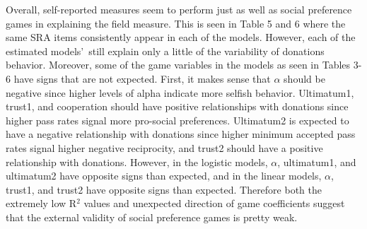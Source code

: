 \documentclass[12pt]{article}
\begin{document}

Overall, self-reported measures seem to perform just as well as social preference games in explaining the field measure. This is seen in Table 5 and 6 where the same SRA items consistently appear in each of the models. However, each of the estimated models\rq \ still explain only a little of the variability of donations behavior. Moreover, some of the game variables in the models as seen in Tables 3-6 have signs that are not expected. First, it makes sense that \(\alpha\) should be negative since higher levels of alpha indicate more selfish behavior. Ultimatum1, trust1, and cooperation should have positive relationships with donations since higher pass rates signal more pro-social preferences. Ultimatum2 is expected to have a negative relationship with donations since higher minimum accepted pass rates signal higher negative reciprocity, and trust2 should have a positive relationship with donations. However, in the logistic models, \(\alpha\), ultimatum1, and ultimatum2 have opposite signs than expected, and in the linear models, \(\alpha\), trust1, and trust2 have opposite signs than expected. Therefore both the extremely low R$^{2}$ values and unexpected direction of game coefficients suggest that the external validity of social preference games is pretty weak.
\end{document}
